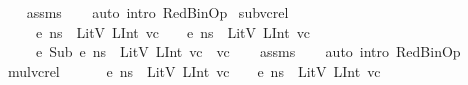 \begin{isabellebody}
%
\isadelimproof
\ \ %
\endisadelimproof
%
\isatagproof
{}\isamarkupfalse%
\ assms\isanewline
\ \ \isamarkupfalse%
\ {\isacharparenleft}{\kern0pt}auto\ intro{\isacharcolon}{\kern0pt}\ RedBinOp{\isacharparenright}{\kern0pt}%
\endisatagproof
{\isafoldproof}%
%
\isadelimproof
\isanewline
%
\endisadelimproof
\isanewline
{}\isamarkupfalse%
\ sub{\isacharunderscore}{\kern0pt}vc{\isacharunderscore}{\kern0pt}rel{\isacharcolon}{\kern0pt}\ \isanewline
\ \ \ {\isachardoublequoteopen}{\isasymLambda}{\isacharcomma}{\kern0pt}{\isasymGamma}{\isacharcomma}{\kern0pt}{\isasymOmega}\ {\isasymturnstile}\ {\isasymlangle}e{}{\isacharcomma}{\kern0pt}\ ns{\isasymrangle}\ {\isasymDown}\ LitV\ {\isacharparenleft}{\kern0pt}LInt\ {\isacharparenleft}{\kern0pt}vc{}{\isacharparenright}{\kern0pt}{\isacharparenright}{\kern0pt}{\isachardoublequoteclose}\ \ {\isachardoublequoteopen}{\isasymLambda}{\isacharcomma}{\kern0pt}{\isasymGamma}{\isacharcomma}{\kern0pt}{\isasymOmega}\ {\isasymturnstile}\ {\isasymlangle}e{}{\isacharcomma}{\kern0pt}\ ns{\isasymrangle}\ {\isasymDown}\ LitV\ {\isacharparenleft}{\kern0pt}LInt\ vc{}{\isacharparenright}{\kern0pt}{\isachardoublequoteclose}\isanewline
\ \ \ {\isachardoublequoteopen}{\isasymLambda}{\isacharcomma}{\kern0pt}{\isasymGamma}{\isacharcomma}{\kern0pt}{\isasymOmega}\ {\isasymturnstile}\ {\isasymlangle}e{}\ {\isasymguillemotleft}Sub{\isasymguillemotright}\ e{}{\isacharcomma}{\kern0pt}\ ns{\isasymrangle}\ {\isasymDown}\ LitV\ {\isacharparenleft}{\kern0pt}LInt\ {\isacharparenleft}{\kern0pt}vc{}\ {\isacharminus}{\kern0pt}\ vc{}{\isacharparenright}{\kern0pt}{\isacharparenright}{\kern0pt}{\isachardoublequoteclose}\isanewline
%
\isadelimproof
\ \ %
\endisadelimproof
%
\isatagproof
{}\isamarkupfalse%
\ assms\isanewline
\ \ \isamarkupfalse%
\ {\isacharparenleft}{\kern0pt}auto\ intro{\isacharcolon}{\kern0pt}\ RedBinOp{\isacharparenright}{\kern0pt}%
\endisatagproof
{\isafoldproof}%
%
\isadelimproof
\isanewline
%
\endisadelimproof
\isanewline
{}\isamarkupfalse%
\ mul{\isacharunderscore}{\kern0pt}vc{\isacharunderscore}{\kern0pt}rel{\isacharcolon}{\kern0pt}\ \isanewline
\ \ \ {\isachardoublequoteopen}{\isasymLambda}{\isacharcomma}{\kern0pt}{\isasymGamma}{\isacharcomma}{\kern0pt}{\isasymOmega}\ {\isasymturnstile}\ {\isasymlangle}e{}{\isacharcomma}{\kern0pt}\ ns{\isasymrangle}\ {\isasymDown}\ LitV\ {\isacharparenleft}{\kern0pt}LInt\ vc{}{\isacharparenright}{\kern0pt}{\isachardoublequoteclose}\ \ {\isachardoublequoteopen}{\isasymLambda}{\isacharcomma}{\kern0pt}{\isasymGamma}{\isacharcomma}{\kern0pt}{\isasymOmega}\ {\isasymturnstile}\ {\isasymlangle}e{}{\isacharcomma}{\kern0pt}\ ns{\isasymrangle}\ {\isasymDown}\ LitV\ {\isacharparenleft}{\kern0pt}LInt\ vc{}{\isacharparenright}{\kern0pt}{\isachardoublequoteclose}\isanewline

\end{isabellebody}
